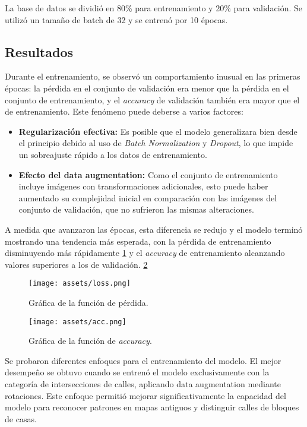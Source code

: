 \documentclass[twocolumn, fontsize=10pt]{article}
\begin{document}
La base de datos se dividió en 80\% para entrenamiento y 20\% para validación. Se utilizó un tamaño de batch de 32 y se entrenó por 10 épocas.

\subsection{Resultados}
Durante el entrenamiento, se observó un comportamiento inusual en las primeras épocas: la pérdida en el conjunto de validación era menor que la pérdida en el conjunto de entrenamiento, y el \textit{accuracy} de validación también era mayor que el de entrenamiento. Este fenómeno puede deberse a varios factores:

\begin{itemize}
    \item \textbf{Regularización efectiva:} Es posible que el modelo generalizara bien desde el principio debido al uso de \textit{Batch Normalization} y \textit{Dropout}, lo que impide un sobreajuste rápido a los datos de entrenamiento.
    \item \textbf{Efecto del data augmentation:} Como el conjunto de entrenamiento incluye imágenes con transformaciones adicionales, esto puede haber aumentado su complejidad inicial en comparación con las imágenes del conjunto de validación, que no sufrieron las mismas alteraciones.
\end{itemize}

A medida que avanzaron las épocas, esta diferencia se redujo y el modelo terminó mostrando una tendencia más esperada, con la pérdida de entrenamiento disminuyendo más rápidamente \ref{fig:loss} y el \textit{accuracy} de entrenamiento alcanzando valores superiores a los de validación. \ref{fig:acc}

\begin{figure}[H]
    \centering
    \texttt{[image: assets/loss.png]}
    \caption{Gráfica de la función de pérdida.}
    \label{fig:loss}
\end{figure}

\begin{figure}[H]
    \centering
    \texttt{[image: assets/acc.png]}
    \caption{Gráfica de la función de \textit{accuracy}.}
    \label{fig:acc}
\end{figure}

Se probaron diferentes enfoques para el entrenamiento del modelo. El mejor desempeño se obtuvo cuando se entrenó el modelo exclusivamente con la categoría de intersecciones de calles, aplicando data augmentation mediante rotaciones. Este enfoque permitió mejorar significativamente la capacidad del modelo para reconocer patrones en mapas antiguos y distinguir calles de bloques de casas.
\end{document}
